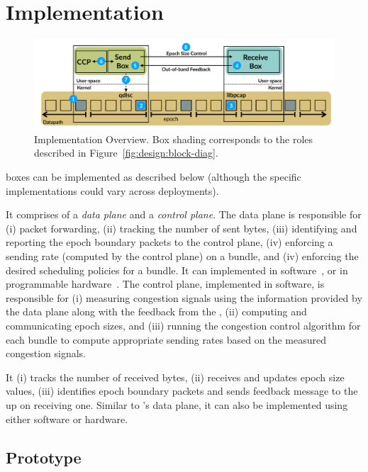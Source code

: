 \section{Implementation}\label{s:impl}
\begin{figure}[t]
    \centering
    \includegraphics[width=2\columnwidth]{img/bundler-diagram}
    \caption{\name Implementation Overview. Box shading corresponds to the roles described in Figure~\ref{fig:design:block-diag}.}\label{fig:bundler}
\end{figure}

\name boxes can be implemented as described below (although the specific implementations could vary across deployments).

\Para{\capinbox} It comprises of a \emph{data plane} and a \emph{control plane}. The data plane is responsible for (i) packet forwarding, (ii) tracking the number of sent bytes, (iii) identifying and reporting the epoch boundary packets to the control plane, (iv) enforcing a sending rate (computed by the control plane) on a bundle, and (iv) enforcing the desired scheduling policies for a bundle. It can implemented in software~\cite{bess, click, netbricks, tc}, or in programmable
hardware~\cite{p4}. The control plane, implemented in software, is responsible for (i) measuring congestion signals using the information provided by the data plane along with the feedback from the \outbox, (ii) computing and communicating epoch sizes, and (iii) running the congestion control algorithm for each bundle to compute appropriate sending rates based on the measured congestion signals.

\Para{\capoutbox} It (i) tracks the number of received bytes, (ii) receives and updates epoch size values, (iii) identifies epoch boundary packets and sends feedback message to the \inbox up on receiving one. Similar to \inbox's data plane, it can also be implemented using either software or hardware.

\subsection{Prototype}\label{s:impl:prototype}

